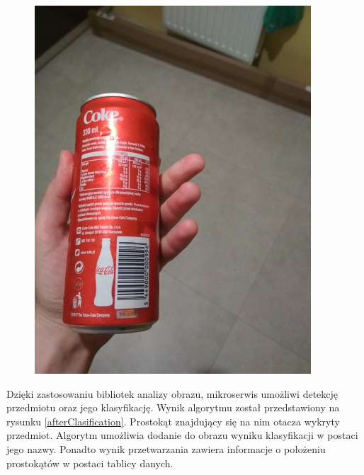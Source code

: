 {{\begin{figure}[htb]
\begin{minipage}
	\end{minipage}
	\begin{minipage}{0.57\textwidth}
		\includegraphics[width=\linewidth]{"images/detection_sample2"}
	\end{minipage}
\end{figure}

Dzięki zastosowaniu bibliotek analizy obrazu, mikroserwis umożliwi detekcję przedmiotu oraz jego klasyfikację. Wynik algorytmu został przedstawiony na rysunku \ref{afterClasification}. Prostokąt znajdujący się na nim otacza wykryty przedmiot. Algorytm umożliwia dodanie do obrazu wyniku klasyfikacji w postaci jego nazwy. Ponadto wynik przetwarzania zawiera informacje o położeniu prostokątów w postaci tablicy danych.


}}
